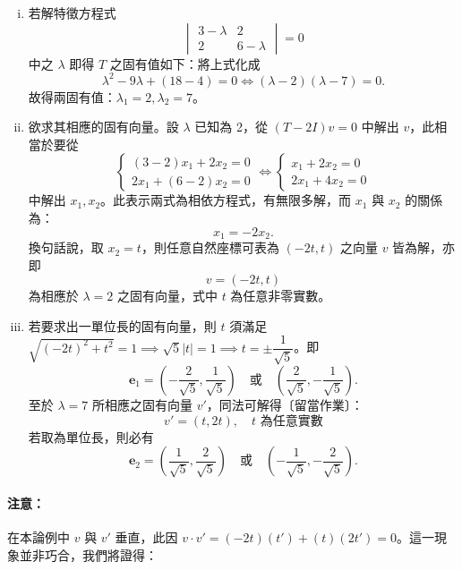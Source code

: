 \begin{solution}
\begin{enumerate}[(i)]
  \item 若解特徵方程式
  \[
  \begin{vmatrix} 3 - \lambda & 2 \\ 2 & 6 - \lambda \end{vmatrix} = 0
  \]
  中之 $\lambda$ 即得 $T$ 之固有值如下：將上式化成
  \[
  \lambda^2 - 9\lambda + (18 - 4) = 0 \iff (\lambda - 2)(\lambda - 7) = 0.
  \]
  故得兩固有值：$\lambda_1 = 2, \lambda_2 = 7$。

  \item 欲求其相應的固有向量。設 $\lambda$ 已知為 2，從 $(T - 2I)v = 0$ 中解出 $v$，此相當於要從
  \[
  \begin{cases}
  (3 - 2)x_1 + 2x_2 = 0 \\
  2x_1 + (6 - 2)x_2 = 0
  \end{cases}
  \iff
  \begin{cases}
  x_1 + 2x_2 = 0 \\
  2x_1 + 4x_2 = 0
  \end{cases}
  \]
  中解出 $x_1, x_2$。此表示兩式為相依方程式，有無限多解，而 $x_1$ 與 $x_2$ 的關係為：
  \[
  x_1 = -2x_2.
  \]
  換句話說，取 $x_2 = t$，則任意自然座標可表為 $(-2t, t)$ 之向量 $v$ 皆為解，亦即
  \[
  v = (-2t, t)
  \]
  為相應於 $\lambda = 2$ 之固有向量，式中 $t$ 為任意非零實數。

  \item 若要求出一單位長的固有向量，則 $t$ 須滿足 $\sqrt{(-2t)^2 + t^2} = 1 \implies \sqrt{5}|t| = 1 \implies t = \pm \dfrac{1}{\sqrt{5}}$。即
  \[
  \mathbf{e}_1 = \left( -\frac{2}{\sqrt{5}}, \frac{1}{\sqrt{5}} \right) \quad \text{或} \quad \left( \frac{2}{\sqrt{5}}, -\frac{1}{\sqrt{5}} \right).
  \]
  至於 $\lambda = 7$ 所相應之固有向量 $v'$，同法可解得〔留當作業〕：
  \[
  v' = (t, 2t), \quad t \text{ 為任意實數}
  \]
  若取為單位長，則必有
  \[
  \mathbf{e}_2 = \left( \frac{1}{\sqrt{5}}, \frac{2}{\sqrt{5}} \right) \quad \text{或} \quad \left( -\frac{1}{\sqrt{5}}, -\frac{2}{\sqrt{5}} \right).
  \]
\end{enumerate}
\end{solution}

\paragraph{注意：}
在本論例中 $v$ 與 $v'$ 垂直，此因 $v \cdot v' = (-2t)(t') + (t)(2t') = 0$。這一現象並非巧合，我們將證得：

